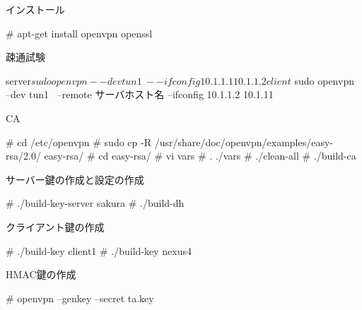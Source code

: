 \begin{frame}[containsverbatim]{インストール}
\begin{commandline}
 # apt-get install openvpn openssl
\end{commandline}
\end{frame}

\begin{frame}[containsverbatim]{疎通試験}
\begin{commandline}
 server$ sudo openvpn --dev tun1  \
    --ifconfig 10.1.1.1 10.1.1.2 
 client$ sudo openvpn --dev tun1  \
    --remote サーバホスト名 --ifconfig 10.1.1.2 10.1.11
\end{commandline}
\end{frame}

\begin{frame}[containsverbatim]{CA}
 \begin{commandline}
 # cd /etc/openvpn
 # sudo cp -R /usr/share/doc/openvpn/examples/easy-rsa/2.0/ easy-rsa/
 # cd easy-rsa/
 # vi vars
 # . ./vars
 # ./clean-all
 # ./build-ca

\end{commandline}
\end{frame}

\begin{frame}[containsverbatim]{サーバー鍵の作成と設定の作成}

\begin{commandline}
 # ./build-key-server sakura
 # ./build-dh  
\end{commandline}

\end{frame}

\begin{frame}[containsverbatim]{クライアント鍵の作成}
\begin{commandline}
 # ./build-key client1
 # ./build-key nexus4
\end{commandline}
\end{frame}

\begin{frame}[containsverbatim]{HMAC鍵の作成}
\begin{commandline}
 # openvpn --genkey --secret ta.key
\end{commandline}
\end{frame}


